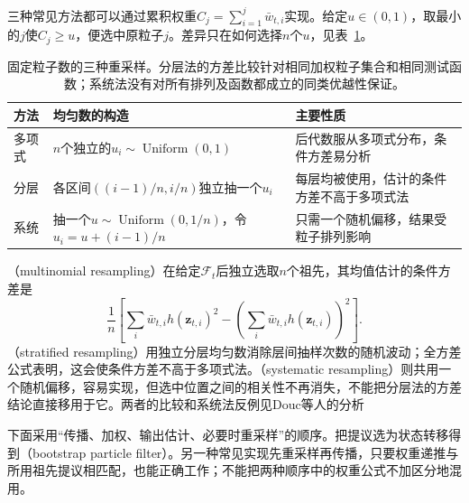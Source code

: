 三种常见方法都可以通过累积权重$C_j=\sum_{i=1}^{j}\bar w_{t,i}$实现。给定$u\in(0,1)$，取最小的$j$使$C_j\geq u$，便选中原粒子$j$。差异只在如何选择$n$个$u$，见表~\ref{tab:pgm-sampling-resampling}。

\begin{table}[htbp]
  \centering
  \begin{tabularx}{\linewidth}{@{}lXX@{}}
    \toprule
    方法 & 均匀数的构造 & 主要性质\\
    \midrule
    多项式 & $n$个独立的$u_i\sim\operatorname{Uniform}(0,1)$ & 后代数服从多项式分布，条件方差易分析\\
    分层 & 各区间$((i-1)/n,i/n)$独立抽一个$u_i$ & 每层均被使用，估计的条件方差不高于多项式法\\
    系统 & 抽一个$u\sim\operatorname{Uniform}(0,1/n)$，令$u_i=u+(i-1)/n$ & 只需一个随机偏移，结果受粒子排列影响\\
    \bottomrule
  \end{tabularx}
  \caption{固定粒子数的三种重采样。分层法的方差比较针对相同加权粒子集合和相同测试函数；系统法没有对所有排列及函数都成立的同类优越性保证。}
  \label{tab:pgm-sampling-resampling}
\end{table}

（multinomial resampling）在给定$\mathcal{F}_t$后独立选取$n$个祖先，其均值估计的条件方差是
\begin{equation}
  \frac1n\left[
    \sum_i\bar w_{t,i}h(\bm{z}_{t,i})^2
      -\left(\sum_i\bar w_{t,i}h(\bm{z}_{t,i})\right)^2
  \right].
  \label{eq:pgm-sampling-resampling-variance}
\end{equation}
（stratified resampling）用独立分层均匀数消除层间抽样次数的随机波动；全方差公式表明，这会使条件方差不高于多项式法。（systematic resampling）则共用一个随机偏移，容易实现，但选中位置之间的相关性不再消失，不能把分层法的方差结论直接移用于它。两者的比较和系统法反例见Douc等人的分析

下面采用“传播、加权、输出估计、必要时重采样”的顺序。把提议选为状态转移得到（bootstrap particle filter）。另一种常见实现先重采样再传播，只要权重递推与所用祖先提议相匹配，也能正确工作；不能把两种顺序中的权重公式不加区分地混用。

